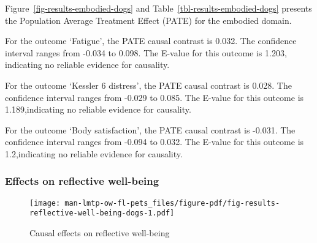 \documentclass[
  singlecolumn,
  9pt]{article}
\begin{document}
Figure~\ref{fig-results-embodied-dogs} and
Table~\ref{tbl-results-embodied-dogs} presents the Population Average
Treatment Effect (PATE) for the embodied domain.

For the outcome `Fatigue', the PATE causal contrast is 0.032. The
confidence interval ranges from -0.034 to 0.098. The E-value for this
outcome is 1.203, indicating no reliable evidence for causality.

For the outcome `Kessler 6 distress', the PATE causal contrast is 0.028.
The confidence interval ranges from -0.029 to 0.085. The E-value for
this outcome is 1.189,indicating no reliable evidence for causality.

For the outcome `Body satisfaction', the PATE causal contrast is -0.031.
The confidence interval ranges from -0.094 to 0.032. The E-value for
this outcome is 1.2,indicating no reliable evidence for causality.

\newpage{}

\subsubsection{Effects on reflective
well-being}\label{effects-on-reflective-well-being-1}

\begin{figure}

{\centering \texttt{[image: man-lmtp-ow-fl-pets\_files/figure-pdf/fig-results-reflective-well-being-dogs-1.pdf]}

}

\caption{\label{fig-results-reflective-well-being-dogs}Causal effects on
reflective well-being}

\end{figure}

\newpage{}
\end{document}

